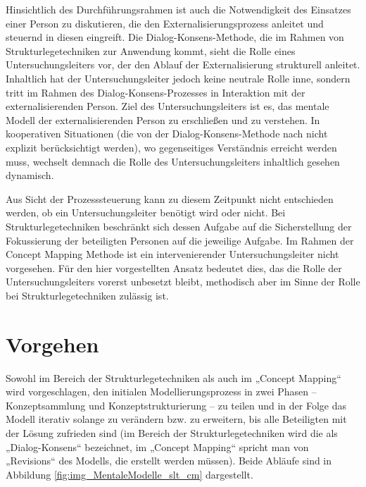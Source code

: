 Hinsichtlich des Durchführungsrahmen ist auch die Notwendigkeit des Einsatzes einer Person zu diskutieren, die den Externalisierungsprozess anleitet und steuernd in diesen eingreift. Die Dialog-Konsens-Methode, die im Rahmen von Strukturlegetechniken zur Anwendung kommt, sieht die Rolle eines Untersuchungsleiters vor, der den Ablauf der Externalisierung strukturell anleitet. Inhaltlich hat der Untersuchungsleiter jedoch keine neutrale Rolle inne, sondern tritt im Rahmen des Dialog-Konsens-Prozesses in Interaktion mit der externalisierenden Person. Ziel des Untersuchungsleiters ist es, das mentale Modell der externalisierenden Person zu erschließen und zu verstehen. In kooperativen Situationen (die von der Dialog-Konsens-Methode nach \citep{Scheele88} nicht explizit berücksichtigt werden), wo gegenseitiges Verständnis erreicht werden muss, wechselt demnach die Rolle des Untersuchungsleiters inhaltlich gesehen dynamisch. 

Aus Sicht der Prozesssteuerung kann zu diesem Zeitpunkt nicht entschieden werden, ob ein Untersuchungsleiter benötigt wird oder nicht. Bei Strukturlegetechniken beschränkt sich dessen Aufgabe auf die Sicherstellung der Fokussierung der beteiligten Personen auf die jeweilige Aufgabe. Im Rahmen der Concept Mapping Methode ist ein intervenierender Untersuchungsleiter nicht vorgesehen. Für den hier vorgestellten Ansatz bedeutet dies, das die Rolle der Untersuchungsleiters vorerst unbesetzt bleibt, methodisch aber im Sinne der Rolle bei Strukturlegetechniken zulässig ist. 


\section{Vorgehen} %
\label{sub:vorgehen}

Sowohl im Bereich der Strukturlegetechniken als auch im „Concept Mapping“ wird vorgeschlagen, den initialen Modellierungsprozess in zwei Phasen -- Konzeptsammlung und Konzeptstrukturierung -- zu teilen und in der Folge das Modell iterativ solange zu verändern bzw. zu erweitern, bis alle Beteiligten mit der Lösung zufrieden sind (im Bereich der Strukturlegetechniken wird die als „Dialog-Konsens“ bezeichnet, im „Concept Mapping“ spricht man von „Revisions“ des Modells, die erstellt werden müssen). Beide Abläufe sind in Abbildung \ref{fig:img_MentaleModelle_slt_cm} dargestellt.

